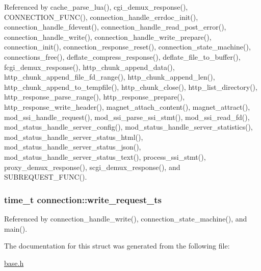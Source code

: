 Referenced by cache\-\_\-parse\-\_\-lua(), cgi\-\_\-demux\-\_\-response(), C\-O\-N\-N\-E\-C\-T\-I\-O\-N\-\_\-\-F\-U\-N\-C(), connection\-\_\-handle\-\_\-errdoc\-\_\-init(), connection\-\_\-handle\-\_\-fdevent(), connection\-\_\-handle\-\_\-read\-\_\-post\-\_\-error(), connection\-\_\-handle\-\_\-write(), connection\-\_\-handle\-\_\-write\-\_\-prepare(), connection\-\_\-init(), connection\-\_\-response\-\_\-reset(), connection\-\_\-state\-\_\-machine(), connections\-\_\-free(), deflate\-\_\-compress\-\_\-response(), deflate\-\_\-file\-\_\-to\-\_\-buffer(), fcgi\-\_\-demux\-\_\-response(), http\-\_\-chunk\-\_\-append\-\_\-data(), http\-\_\-chunk\-\_\-append\-\_\-file\-\_\-fd\-\_\-range(), http\-\_\-chunk\-\_\-append\-\_\-len(), http\-\_\-chunk\-\_\-append\-\_\-to\-\_\-tempfile(), http\-\_\-chunk\-\_\-close(), http\-\_\-list\-\_\-directory(), http\-\_\-response\-\_\-parse\-\_\-range(), http\-\_\-response\-\_\-prepare(), http\-\_\-response\-\_\-write\-\_\-header(), magnet\-\_\-attach\-\_\-content(), magnet\-\_\-attract(), mod\-\_\-ssi\-\_\-handle\-\_\-request(), mod\-\_\-ssi\-\_\-parse\-\_\-ssi\-\_\-stmt(), mod\-\_\-ssi\-\_\-read\-\_\-fd(), mod\-\_\-status\-\_\-handle\-\_\-server\-\_\-config(), mod\-\_\-status\-\_\-handle\-\_\-server\-\_\-statistics(), mod\-\_\-status\-\_\-handle\-\_\-server\-\_\-status\-\_\-html(), mod\-\_\-status\-\_\-handle\-\_\-server\-\_\-status\-\_\-json(), mod\-\_\-status\-\_\-handle\-\_\-server\-\_\-status\-\_\-text(), process\-\_\-ssi\-\_\-stmt(), proxy\-\_\-demux\-\_\-response(), scgi\-\_\-demux\-\_\-response(), and S\-U\-B\-R\-E\-Q\-U\-E\-S\-T\-\_\-\-F\-U\-N\-C().

\hypertarget{structconnection_a56f8f4cad319b1d2e3db5ac960cf09c9}{
\subsubsection[{write\-\_\-request\-\_\-ts}]{\setlength{\rightskip}{0pt plus 5cm}time\-\_\-t connection\-::write\-\_\-request\-\_\-ts}}\label{structconnection_a56f8f4cad319b1d2e3db5ac960cf09c9}


Referenced by connection\-\_\-handle\-\_\-write(), connection\-\_\-state\-\_\-machine(), and main().



The documentation for this struct was generated from the following file\-:\begin{DoxyCompactItemize}
\item 
\hyperlink{base_8h}{base.\-h}\end{DoxyCompactItemize}
